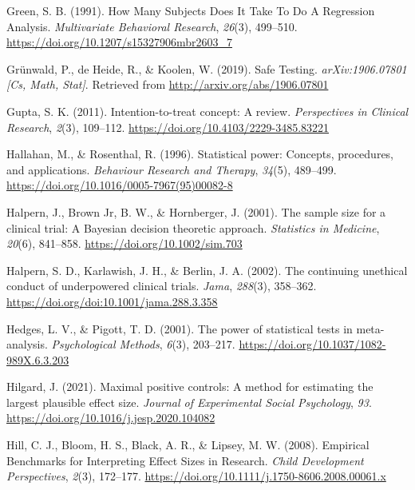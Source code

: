 \documentclass[
  english,
  ,jou, a4paper,floatsintext]{apa6}
\newlength{\cslhangindent}
\newenvironment{cslreferences}%
  {\setlength{\parindent}{0pt}%
  \everypar{\setlength{\hangindent}{\cslhangindent}}\ignorespaces}%
  {\par}
\begin{document}
\begin{cslreferences}
\leavevmode\hypertarget{ref-green_how_1991}{}%
Green, S. B. (1991). How Many Subjects Does It Take To Do A Regression Analysis. \emph{Multivariate Behavioral Research}, \emph{26}(3), 499--510. \url{https://doi.org/10.1207/s15327906mbr2603_7}

\leavevmode\hypertarget{ref-grunwald_safe_2019}{}%
Grünwald, P., de Heide, R., \& Koolen, W. (2019). Safe Testing. \emph{arXiv:1906.07801 {[}Cs, Math, Stat{]}}. Retrieved from \url{http://arxiv.org/abs/1906.07801}

\leavevmode\hypertarget{ref-gupta_intention_2011}{}%
Gupta, S. K. (2011). Intention-to-treat concept: A review. \emph{Perspectives in Clinical Research}, \emph{2}(3), 109--112. \url{https://doi.org/10.4103/2229-3485.83221}

\leavevmode\hypertarget{ref-hallahan_statistical_1996}{}%
Hallahan, M., \& Rosenthal, R. (1996). Statistical power: Concepts, procedures, and applications. \emph{Behaviour Research and Therapy}, \emph{34}(5), 489--499. \url{https://doi.org/10.1016/0005-7967(95)00082-8}

\leavevmode\hypertarget{ref-halpern_sample_2001}{}%
Halpern, J., Brown Jr, B. W., \& Hornberger, J. (2001). The sample size for a clinical trial: A Bayesian decision theoretic approach. \emph{Statistics in Medicine}, \emph{20}(6), 841--858. \url{https://doi.org/10.1002/sim.703}

\leavevmode\hypertarget{ref-halpern_continuing_2002}{}%
Halpern, S. D., Karlawish, J. H., \& Berlin, J. A. (2002). The continuing unethical conduct of underpowered clinical trials. \emph{Jama}, \emph{288}(3), 358--362. \url{https://doi.org/doi:10.1001/jama.288.3.358}

\leavevmode\hypertarget{ref-hedges_power_2001}{}%
Hedges, L. V., \& Pigott, T. D. (2001). The power of statistical tests in meta-analysis. \emph{Psychological Methods}, \emph{6}(3), 203--217. \url{https://doi.org/10.1037/1082-989X.6.3.203}

\leavevmode\hypertarget{ref-hilgard_maximal_2021}{}%
Hilgard, J. (2021). Maximal positive controls: A method for estimating the largest plausible effect size. \emph{Journal of Experimental Social Psychology}, \emph{93}. \url{https://doi.org/10.1016/j.jesp.2020.104082}

\leavevmode\hypertarget{ref-hill_empirical_2008}{}%
Hill, C. J., Bloom, H. S., Black, A. R., \& Lipsey, M. W. (2008). Empirical Benchmarks for Interpreting Effect Sizes in Research. \emph{Child Development Perspectives}, \emph{2}(3), 172--177. \url{https://doi.org/10.1111/j.1750-8606.2008.00061.x}


\end{cslreferences}
\end{document}
